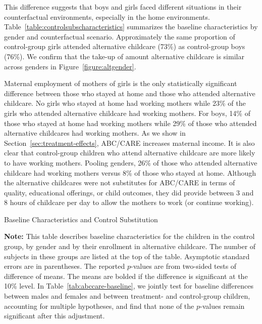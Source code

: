 This difference suggests that boys and girls faced different situations in their counterfactual environments, especially in the home environments. Table~\ref{table:controlsubscharacteristics} summarizes the baseline characteristics by gender and counterfactual scenario. Approximately the same proportion of control-group girls attended alternative childcare (73\%)  as control-group boys (76\%). We confirm that the take-up of amount alternative childcare is similar across genders in Figure~\ref{figure:altgender}. 

Maternal employment of mothers of girls is the only statistically significant difference between those who stayed at home and those who attended alternative childcare. No girls who stayed at home had working mothers while 23\% of the girls who attended alternative childcare had working mothers. For boys, 14\% of those who stayed at home had working mothers while 29\% of those who attended alternative childcares had working mothers. As we show in Section~\ref{sec:treatment-effects}, ABC/CARE increases maternal income. It is also clear that control-group children who attend alternative childcare are more likely to have working mothers. Pooling genders, 26\% of those who attended alternative childcare had working mothers versus 8\% of those who stayed at home. Although the alternative childcares were not substitutes for ABC/CARE in terms of quality, educational offerings, or child outcomes, they did provide between 3 and 8 hours of childcare per day to allow the mothers to work (or continue working).

\begin{table}
\centering
\begin{threeparttable}
\caption{Baseline Characteristics and Control Substitution}\label{table:controlsubscharacteristics}

\begin{tablenotes}
\item \footnotesize \textbf{Note:} This table describes baseline characteristics for the children in the control group, by gender and by their enrollment in alternative childcare. The number of subjects in these groups are listed at the top of the table. Asymptotic standard errors are in parentheses. The reported $p$-values are from two-sided tests of difference of means. The means are bolded if the difference is significant at the 10\% level. In Table~\ref{tab:abccare-baseline}, we jointly test for baseline differences between males and females and between treatment- and control-group children, accounting for multiple hypotheses, and find that none of the $p$-values remain significant after this adjustment.
\end{tablenotes}
\end{threeparttable}
\end{table}

